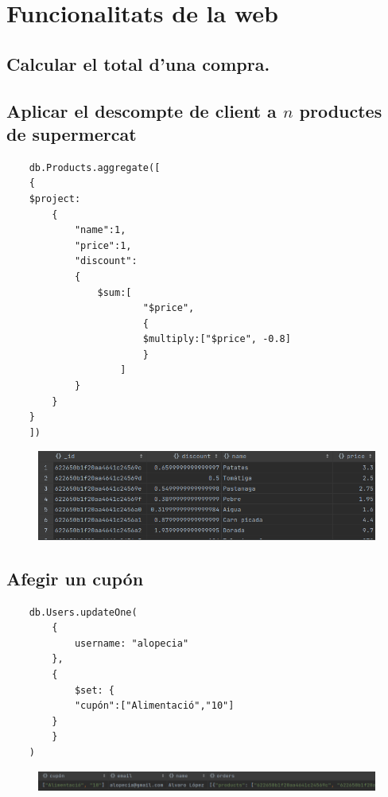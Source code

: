 \newpage

\section{Funcionalitats de la web}

\subsection{Calcular el total d'una compra.}


\subsection{Aplicar el descompte de client a $n$ productes de supermercat}

\begin{verbatim}
    db.Products.aggregate([
    {
    $project:
        {
            "name":1,
            "price":1,
            "discount":
            {
                $sum:[
                        "$price",
                        {
                        $multiply:["$price", -0.8]
                        }
                    ]
            }
        }
    }
    ])
\end{verbatim}

\begin{figure}[htpb!]
    \centering
    \includegraphics[width=400pt]{figures/discount.png}
\end{figure}

\subsection{Afegir un cupón}

\begin{verbatim}
    db.Users.updateOne(
        {
            username: "alopecia"
        },
        {
            $set: {
            "cupón":["Alimentació","10"]
        }
        }
    )
\end{verbatim}

\begin{figure}[htpb!]
    \centering
    \includegraphics[width=400pt]{figures/cupon.png}
\end{figure}

